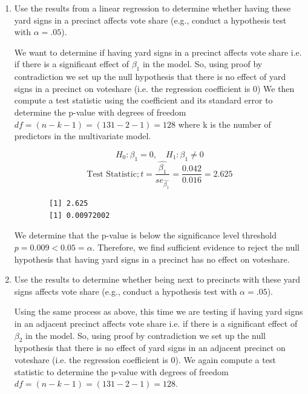 \documentclass[12pt,letterpaper]{article}
\begin{document}
	\newpage
\begin{enumerate}
	\item [(a)] Use the results from a linear regression to determine whether having these yard signs in a precinct affects vote share (e.g., conduct a hypothesis test with $\alpha = .05$). 
	\vspace{0.5cm}
	
	 We want to determine if having yard signs in a precinct affects vote share i.e. if there is a significant effect of $\beta_1$ in the model. So, using proof by contradiction we set up the null hypothesis that there is no effect of yard signs in a precinct on voteshare (i.e. the regression coefficient is 0)
	We then compute a test statistic using the coefficient and its standard error to determine the p-value with degrees of freedom  $df = (n - k - 1) = (131 - 2 - 1) = 128$ where k is the number of predictors in the multivariate model. 
	
	\begin{equation*}
	H_0: \beta_1 = 0, \quad H_1: \beta_1 \ne 0
	\end{equation*}
	\begin{equation*}
	\text{Test Statistic}; t = \frac{\hat{\beta_1}}{se_{\hat{\beta_1}}} = \frac{0.042}{0.016} = 2.625
	\end{equation*}

	
	\begin{verbatim}
		[1] 2.625
		[1] 0.00972002
	\end{verbatim}
	
	We determine that the p-value is below the significance level threshold $p = 0.009 < 0.05 = \alpha$. Therefore, we find sufficient evidence to reject the null hypothesis that having yard signs in a precinct has no effect on voteshare.   
	

	
	
	\newpage
	\item [(b)]  Use the results to determine whether being
	next to precincts with these yard signs affects vote
	share (e.g., conduct a hypothesis test with $\alpha = .05$).
	\vspace{1cm}
	
	Using the same process as above, this time we are testing if having yard signs in an adjacent precinct affects vote share i.e. if there is a significant effect of $\beta_2$ in the model. So, using proof by contradiction we set up the null hypothesis that there is no effect of yard signs in an adjacent precinct on voteshare (i.e. the regression coefficient is 0). We again compute a test statistic to determine the p-value with degrees of freedom  $df = (n - k - 1) = (131 - 2 - 1) = 128$. 
	

\end{enumerate}
\end{document}
